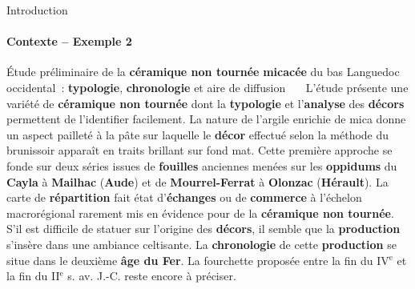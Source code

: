 \begin{frame}{Introduction}\framesubtitle{Contexte -- Exemple 2}
  \begin{exampleblock}{\small
    Étude préliminaire de la \textbf{\normalsize céramique non tournée}
    \textbf{\normalsize micacée} du bas Languedoc occidental~:
    \textbf{\normalsize typologie}, \textbf{\normalsize chronologie} et aire de
    diffusion
  }\justifying\small
    ~~~L'étude présente une variété de \textbf{\normalsize céramique non tournée}
    dont la \textbf{\normalsize typologie} et l'\textbf{\normalsize analyse} des
    \textbf{\normalsize décors} permettent de l'identifier facilement. La nature
    de l'argile enrichie de mica donne un aspect pailleté à la pâte sur laquelle
    le \textbf{\normalsize décor} effectué selon la méthode du brunissoir
    apparaît en traits brillant sur fond mat. Cette première approche se fonde
    sur deux séries issues de \textbf{\normalsize fouilles} anciennes menées sur
    les \textbf{\normalsize oppidums} du \textbf{\normalsize Cayla} à
    \textbf{\normalsize Mailhac} (\textbf{\normalsize Aude}) et de
    \textbf{\normalsize Mourrel-Ferrat} à \textbf{\normalsize Olonzac}
    (\textbf{\normalsize Hérault}). La carte de \textbf{\normalsize répartition}
    fait état d'\textbf{\normalsize échanges} ou de \textbf{\normalsize commerce}
    à l'échelon macrorégional rarement mis en évidence pour de la
    \textbf{\normalsize céramique non tournée}. S'il est difficile de statuer
    sur l'origine des \textbf{\normalsize décors}, il semble que la
    \textbf{\normalsize production} s'insère dans une ambiance celtisante. La
    \textbf{\normalsize chronologie} de cette \textbf{\normalsize production} se
    situe dans le deuxième \textbf{\normalsize âge du Fer}. La fourchette
    proposée entre la fin du IV$^\text{e}$ et la fin du II$^\text{e}$ s. av.
    J.-C. reste encore à préciser.
  \end{exampleblock}
\end{frame}

